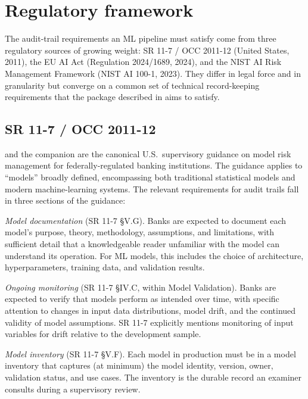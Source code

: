 \section{Regulatory framework}\label{sec:regulatory}

\sloppy

The audit-trail requirements an ML pipeline must satisfy come from three regulatory sources of growing weight: SR 11-7 / OCC 2011-12 (United States, 2011), the EU AI Act (Regulation 2024/1689, 2024), and the NIST AI Risk Management Framework (NIST AI 100-1, 2023). They differ in legal force and in granularity but converge on a common set of technical record-keeping requirements that the package described in  aims to satisfy.

\subsection{SR 11-7 / OCC 2011-12}\label{sec:sr117}

\citet{FedSR117} and the companion \citet{OCC2011} are the canonical U.S.\ supervisory guidance on model risk management for federally-regulated banking institutions. The guidance applies to ``models'' broadly defined, encompassing both traditional statistical models and modern machine-learning systems. The relevant requirements for audit trails fall in three sections of the guidance:

\textit{Model documentation} (SR 11-7 §V.G). Banks are expected to document each model's purpose, theory, methodology, assumptions, and limitations, with sufficient detail that a knowledgeable reader unfamiliar with the model can understand its operation. For ML models, this includes the choice of architecture, hyperparameters, training data, and validation results.

\textit{Ongoing monitoring} (SR 11-7 §IV.C, within Model Validation). Banks are expected to verify that models perform as intended over time, with specific attention to changes in input data distributions, model drift, and the continued validity of model assumptions. SR 11-7 explicitly mentions monitoring of input variables for drift relative to the development sample.

\textit{Model inventory} (SR 11-7 §V.F). Each model in production must be in a model inventory that captures (at minimum) the model identity, version, owner, validation status, and use cases. The inventory is the durable record an examiner consults during a supervisory review.

